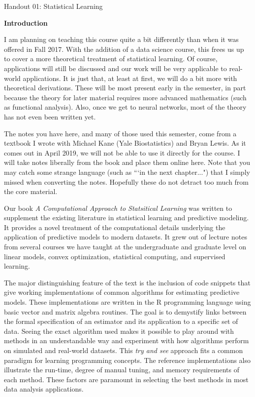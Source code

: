 \documentclass[12pt,hidelinks]{article}
\numberwithin{equation}{section}
\begin{document}
{\LARGE Handout 01: Statistical Learning}

\vspace*{18pt}

\textbf{Introduction}

I am planning on teaching this course quite a bit differently than when it was
offered in Fall 2017. With the addition of a data science course, this frees
us up to cover a more theoretical treatment of statistical learning. Of
course, applications will still be discussed and our work will be very
applicable to real-world applications. It is just that, at least at first,
we will do a bit more with theoretical derivations. These will be most
present early in the semester, in part because the theory for later material
requires more advanced mathematics (such as functional analysis). Also, once
we get to neural networks, most of the theory has not even been written yet.

The notes you have here, and many of those used this semester, come from a
textbook I wrote with Michael Kane (Yale Biostatistics) and Bryan Lewis. As
it comes out in April 2019, we will not be able to use it directly for the
course. I will take notes liberally from the book and place them online here.
Note that you may catch some strange language (such as ```in the next
chapter...") that I simply missed when converting the notes. Hopefully these
do not detract too much from the core material.

Our book \textit{A Computational Approach to Statsitical Learning}
was written to supplement the existing literature in statistical
learning and predictive modeling. It provides a novel treatment of
the computational details underlying the application of predictive models to
modern datasets. It grew out of lecture notes from several courses we have
taught at the undergraduate and graduate level on linear models, convex
optimization, statistical computing, and supervised learning.

The major distinguishing feature of the text is the inclusion of code snippets
that give working implementations of common algorithms for
estimating predictive models. These implementations are written in the R
programming language using basic vector and matrix algebra routines. The goal
is to demystify links between the formal specification of an estimator and
its application to a specific set of data. Seeing the
exact algorithm used makes it possible to play around
with methods in an understandable way and experiment with how
algorithms perform on simulated and real-world datasets. This \textit{try and
see} approach fits a common paradigm for learning programming concepts.
The reference implementations also illustrate the run-time,
degree of manual tuning, and memory requirements of each method.
These factors are paramount in selecting the best methods in most
data analysis applications.
\end{document}
